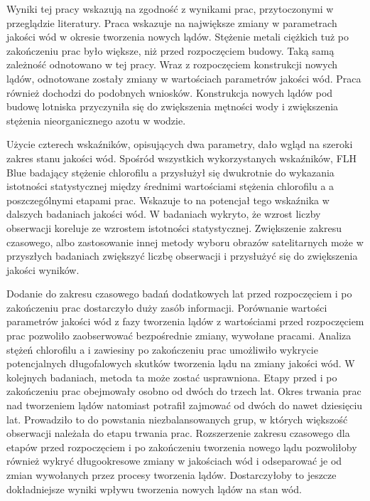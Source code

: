 \documentclass{amuthesis}
\begin{document}
Wyniki tej pracy wskazują na zgodność z wynikami prac, przytoczonymi w
przeglądzie literatury. Praca \textcite{hao2021effects} wskazuje na
największe zmiany w parametrach jakości wód w okresie tworzenia nowych
lądów. Stężenie metali ciężkich tuż po zakończeniu prac było większe,
niż przed rozpoczęciem budowy. Taką samą zależność odnotowano w tej
pracy. Wraz z rozpoczęciem konstrukcji nowych lądów, odnotowane zostały
zmiany w wartościach parametrów jakości wód. Praca
\textcite{wang2023observations} również dochodzi do podobnych wniosków.
Konstrukcja nowych lądów pod budowę lotniska przyczyniła się do
zwiększenia mętności wody i zwiększenia stężenia nieorganicznego azotu w
wodzie.

Użycie czterech wskaźników, opisujących dwa parametry, dało wgląd na
szeroki zakres stanu jakości wód. Spośród wszystkich wykorzystanych
wskaźników, FLH Blue badający stężenie chlorofilu a przysłużył się
dwukrotnie do wykazania istotności statystycznej między średnimi
wartościami stężenia chlorofilu a a poszczególnymi etapami prac.
Wskazuje to na potencjał tego wskaźnika w dalszych badaniach jakości
wód. W badaniach wykryto, że wzrost liczby obserwacji koreluje ze
wzrostem istotności statystycznej. Zwiększenie zakresu czasowego, albo
zastosowanie innej metody wyboru obrazów satelitarnych może w przyszłych
badaniach zwiększyć liczbę obserwacji i przysłużyć się do zwiększenia
jakości wyników.

Dodanie do zakresu czasowego badań dodatkowych lat przed rozpoczęciem i
po zakończeniu prac dostarczyło duży zasób informacji. Porównanie
wartości parametrów jakości wód z fazy tworzenia lądów z wartościami
przed rozpoczęciem prac pozwoliło zaobserwować bezpośrednie zmiany,
wywołane pracami. Analiza stężeń chlorofilu a i zawiesiny po zakończeniu
prac umożliwiło wykrycie potencjalnych długofalowych skutków tworzenia
lądu na zmiany jakości wód. W kolejnych badaniach, metoda ta może zostać
usprawniona. Etapy przed i po zakończeniu prac obejmowały osobno od
dwóch do trzech lat. Okres trwania prac nad tworzeniem lądów natomiast
potrafił zajmować od dwóch do nawet dziesięciu lat. Prowadziło to do
powstania niezbalansowanych grup, w których większość obserwacji
należała do etapu trwania prac. Rozszerzenie zakresu czasowego dla
etapów przed rozpoczęciem i po zakończeniu tworzenia nowego lądu
pozwoliłoby również wykryć długookresowe zmiany w jakościach wód i
odseparować je od zmian wywołanych przez procesy tworzenia lądów.
Dostarczyłoby to jeszcze dokładniejsze wyniki wpływu tworzenia nowych
lądów na stan wód.
\end{document}
